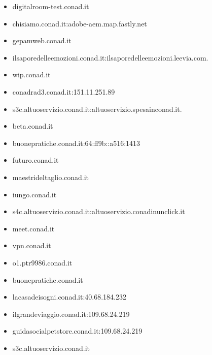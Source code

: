 \documentclass{article}
\begin{document}
\begin{itemize}
        \item digitalroom-test.conad.it
    
        \item chisiamo.conad.it:adobe-aem.map.fastly.net
    
        \item gepamweb.conad.it
    
        \item ilsaporedelleemozioni.conad.it:ilsaporedelleemozioni.leevia.com.
    
        \item wip.conad.it
    
        \item conadrad3.conad.it:151.11.251.89
    
        \item s3c.altuoservizio.conad.it:altuoservizio.spesainconad.it.
    
        \item beta.conad.it
    
        \item buonepratiche.conad.it:64:ff9b::a516:1413
    
        \item futuro.conad.it
    
        \item maestrideltaglio.conad.it
    
        \item iungo.conad.it
    
        \item s4c.altuoservizio.conad.it:altuoservizio.conadinunclick.it
    
        \item meet.conad.it
    
        \item vpn.conad.it
    
        \item o1.ptr9986.conad.it
    
        \item buonepratiche.conad.it
    
        \item lacasadeisogni.conad.it:40.68.184.232
    
        \item ilgrandeviaggio.conad.it:109.68.24.219
    
        \item guidasocialpetstore.conad.it:109.68.24.219
    
        \item s3c.altuoservizio.conad.it
    

\end{itemize}
\end{document}
